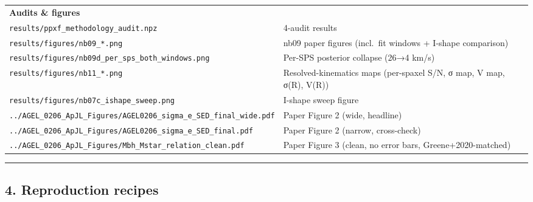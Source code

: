 \documentclass[
  10pt,
]{article}
\begin{document}
\begin{longtable}[]{@{}ll@{}}
\textbf{Audits \& figures} & \\
\texttt{results/ppxf\_methodology\_audit.npz} & 4-audit results \\
\texttt{results/figures/nb09\_*.png} & nb09 paper figures (incl.~fit windows + I-shape comparison) \\
\texttt{results/figures/nb09d\_per\_sps\_both\_windows.png} & Per-SPS posterior collapse (26→4 km/s) \\
\texttt{results/figures/nb11\_*.png} & Resolved-kinematics maps (per-spaxel S/N, σ map, V map, σ(R), V(R)) \\
\texttt{results/figures/nb07c\_ishape\_sweep.png} & I-shape sweep figure \\
\texttt{../AGEL\_0206\_ApJL\_Figures/AGEL0206\_sigma\_e\_SED\_final\_wide.pdf} & Paper Figure 2 (wide, headline) \\
\texttt{../AGEL\_0206\_ApJL\_Figures/AGEL0206\_sigma\_e\_SED\_final.pdf} & Paper Figure 2 (narrow, cross-check) \\
\texttt{../AGEL\_0206\_ApJL\_Figures/Mbh\_Mstar\_relation\_clean.pdf} & Paper Figure 3 (clean, no error bars, Greene+2020-matched) \\
\bottomrule
\end{longtable}\endgroup

\begin{center}\rule{0.5\linewidth}{0.5pt}\end{center}

\hypertarget{reproduction-recipes}{%
\subsection{4. Reproduction recipes}\label{reproduction-recipes}}
\end{document}
